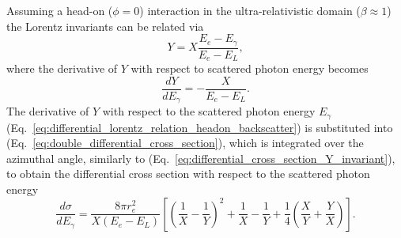 \documentclass[../main.tex]{subfiles}
\begin{document}
Assuming a head-on ($\phi=0$) interaction in the ultra-relativistic domain ($\beta\approx1$) the Lorentz invariants can be related via
\begin{equation}
Y = X\frac{E_{e}-E_{\gamma}}{E_{e}-E_{L}},
\label{eq:lorentz_relation_headon_backscatter}
\end{equation}
where the derivative of $Y$ with respect to scattered photon energy becomes
\begin{equation}
\frac{dY}{dE_{\gamma}} = -\frac{X}{E_{e}-E_{L}}.
\label{eq:differential_lorentz_relation_headon_backscatter}
\end{equation}
The derivative of $Y$ with respect to the scattered photon energy $E_{\gamma}$ (Eq.~\ref{eq:differential_lorentz_relation_headon_backscatter}) is substituted into (Eq.~\ref{eq:double_differential_cross_section}), which is integrated over the azimuthal angle, similarly to (Eq.~\ref{eq:differential_cross_section_Y_invariant}), to obtain the differential cross section with respect to the scattered photon energy
\begin{equation}
\frac{d\sigma}{dE_{\gamma}} = \frac{8\pi r_{e}^{2}}{X\left(E_{e}-E_{L}\right)}\left[\left(\frac{1}{X}-\frac{1}{Y}\right)^{2}+\frac{1}{X}-\frac{1}{Y}+\frac{1}{4}\left(\frac{X}{Y}+\frac{Y}{X}\right)\right].
\label{eq:differential_cross_section_ICS_energy}    
\end{equation}
\end{document}
